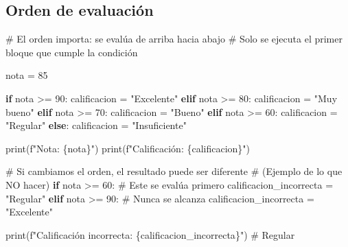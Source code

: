 \documentclass[
  doc,
  floatsintext,
  longtable,
  a4paper,
  nolmodern,
  notxfonts,
  notimes,
  12pt,
  colorlinks=true,linkcolor=blue,citecolor=blue,urlcolor=blue]{apa7}
\newenvironment{Shaded}{\begin{snugshade}}{\end{snugshade}}
\newcommand{\BuiltInTok}[1]{\textcolor[rgb]{0.00,0.23,0.31}{#1}}
\newcommand{\CommentTok}[1]{\textcolor[rgb]{0.37,0.37,0.37}{#1}}
\newcommand{\ControlFlowTok}[1]{\textcolor[rgb]{0.00,0.23,0.31}{\textbf{#1}}}
\newcommand{\DecValTok}[1]{\textcolor[rgb]{0.68,0.00,0.00}{#1}}
\newcommand{\NormalTok}[1]{\textcolor[rgb]{0.00,0.23,0.31}{#1}}
\newcommand{\OperatorTok}[1]{\textcolor[rgb]{0.37,0.37,0.37}{#1}}
\newcommand{\SpecialCharTok}[1]{\textcolor[rgb]{0.37,0.37,0.37}{#1}}
\newcommand{\SpecialStringTok}[1]{\textcolor[rgb]{0.13,0.47,0.30}{#1}}
\newcommand{\StringTok}[1]{\textcolor[rgb]{0.13,0.47,0.30}{#1}}
\begin{document}
\subsection{Orden de evaluación}\label{orden-de-evaluaciuxf3n}

\begin{Shaded}
\begin{Highlighting}[]
\CommentTok{\# El orden importa: se evalúa de arriba hacia abajo}
\CommentTok{\# Solo se ejecuta el primer bloque que cumple la condición}

\NormalTok{nota }\OperatorTok{=} \DecValTok{85}

\ControlFlowTok{if}\NormalTok{ nota }\OperatorTok{\textgreater{}=} \DecValTok{90}\NormalTok{:}
\NormalTok{    calificacion }\OperatorTok{=} \StringTok{"Excelente"}
\ControlFlowTok{elif}\NormalTok{ nota }\OperatorTok{\textgreater{}=} \DecValTok{80}\NormalTok{:}
\NormalTok{    calificacion }\OperatorTok{=} \StringTok{"Muy bueno"}
\ControlFlowTok{elif}\NormalTok{ nota }\OperatorTok{\textgreater{}=} \DecValTok{70}\NormalTok{:}
\NormalTok{    calificacion }\OperatorTok{=} \StringTok{"Bueno"}
\ControlFlowTok{elif}\NormalTok{ nota }\OperatorTok{\textgreater{}=} \DecValTok{60}\NormalTok{:}
\NormalTok{    calificacion }\OperatorTok{=} \StringTok{"Regular"}
\ControlFlowTok{else}\NormalTok{:}
\NormalTok{    calificacion }\OperatorTok{=} \StringTok{"Insuficiente"}

\BuiltInTok{print}\NormalTok{(}\SpecialStringTok{f"Nota: }\SpecialCharTok{\{}\NormalTok{nota}\SpecialCharTok{\}}\SpecialStringTok{"}\NormalTok{)}
\BuiltInTok{print}\NormalTok{(}\SpecialStringTok{f"Calificación: }\SpecialCharTok{\{}\NormalTok{calificacion}\SpecialCharTok{\}}\SpecialStringTok{"}\NormalTok{)}

\CommentTok{\# Si cambiamos el orden, el resultado puede ser diferente}
\CommentTok{\# (Ejemplo de lo que NO hacer)}
\ControlFlowTok{if}\NormalTok{ nota }\OperatorTok{\textgreater{}=} \DecValTok{60}\NormalTok{:  }\CommentTok{\# Este se evalúa primero}
\NormalTok{    calificacion\_incorrecta }\OperatorTok{=} \StringTok{"Regular"}
\ControlFlowTok{elif}\NormalTok{ nota }\OperatorTok{\textgreater{}=} \DecValTok{90}\NormalTok{:  }\CommentTok{\# Nunca se alcanza}
\NormalTok{    calificacion\_incorrecta }\OperatorTok{=} \StringTok{"Excelente"}

\BuiltInTok{print}\NormalTok{(}\SpecialStringTok{f"Calificación incorrecta: }\SpecialCharTok{\{}\NormalTok{calificacion\_incorrecta}\SpecialCharTok{\}}\SpecialStringTok{"}\NormalTok{)  }\CommentTok{\# Regular}
\end{Highlighting}
\end{Shaded}
\end{document}
